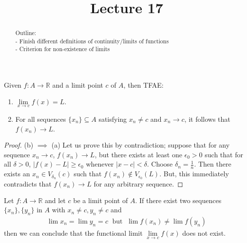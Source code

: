 \documentclass{ximera}
\begin{document}
    \title{Lecture 17}
    
    \begin{abstract}  
    Outline: \\
    - Finish different definitions of continuity/limits of functions \\
    - Criterion for non-existence of limits
\end{abstract}

\maketitle

    \begin{theorem}
        Given $f:A \to \mathbb{R}$ and a limit point $c$ of $A$, then TFAE:
        \begin{enumerate}
            \item $\lim\limits_{x\to c} f(x) = L$.
            \item For all sequences $\{x_n\} \subseteq A$ satisfying $x_n \neq c$ and $x_n \to c$, it follows that $f(x_n) \to L$.
        \end{enumerate}
    \end{theorem}
    \begin{proof}
        (b) $\implies$ (a)
        Let us prove this by contradiction; suppose that for any sequence $x_n \to c$, $f(x_n) \to L$, but there exists at least one $\epsilon_0>0$ such that for all $\delta > 0$, $|f(x) - L| \geq \epsilon_0$ whenever $|x-c| < \delta$.  Choose $\delta_n = \frac1n$.  Then there exists an $x_n \in V_{\delta_n}(c)$ such that $f(x_n) \notin V_{\epsilon_0}(L)$.  But, this immediately contradicts that $f(x_n) \to L$ for any arbitrary sequence.
    \end{proof}



\begin{corollary}
    Let $f:A \to \mathbb{R}$ and let $c$ be a limit point of $A$.  If there exist two sequences $\{x_n\}, \{y_n\}$ in $A$ with $x_n \neq c, y_n \neq c$ and 
    \begin{align*}
        \lim x_n = \lim y_n = c \; \text{ but } \; \lim f(x_n) \neq \lim f(y_n)
    \end{align*}
    then we can conclude that the functional limit $\lim\limits_{x\to c} f(x)$ does not exist.
\end{corollary}
\end{document}
